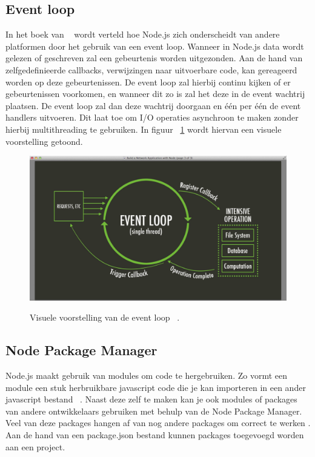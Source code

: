 \subsection{Event loop}
In het boek van ~\textcite{Ali2013} wordt verteld hoe Node.js zich onderscheidt van andere platformen door het gebruik van een event loop.
Wanneer in Node.js data wordt gelezen of geschreven zal een gebeurtenis worden uitgezonden. 
Aan de hand van zelfgedefinieerde callbacks, verwijzingen naar uitvoerbare code, kan gereageerd worden op deze gebeurtenissen. 
De event loop zal hierbij continu kijken of er gebeurtenissen voorkomen, en wanneer dit zo is zal het deze in de event wachtrij plaatsen.
De event loop zal dan deze wachtrij doorgaan en één per één de event handlers uitvoeren. 
Dit laat toe om I/O operaties asynchroon te maken zonder hierbij multithreading te gebruiken.
In figuur ~\ref{fig:eventloop} wordt hiervan een visuele voorstelling getoond.
\begin{figure}[h]
    \centering
    \includegraphics[width=.9\textwidth]{graphics/eventloop.png}
    \caption{\label{fig:eventloop}}Visuele voorstelling van de event loop ~\autocite{Luxembourg2023}.
\end{figure}

\subsection{Node Package Manager}
Node.js maakt gebruik van modules om code te hergebruiken. 
Zo vormt een module een stuk herbruikbare javascript code 
die je kan importeren in een ander javascript bestand ~\autocite{Semah2022}.
Naast deze zelf te maken kan je ook modules of packages van andere ontwikkelaars gebruiken met behulp van de Node Package Manager.
Veel van deze packages hangen af van nog andere packages om correct te werken \autocite{kula2017}.
Aan de hand van een package.json bestand kunnen packages toegevoegd worden aan een project.

